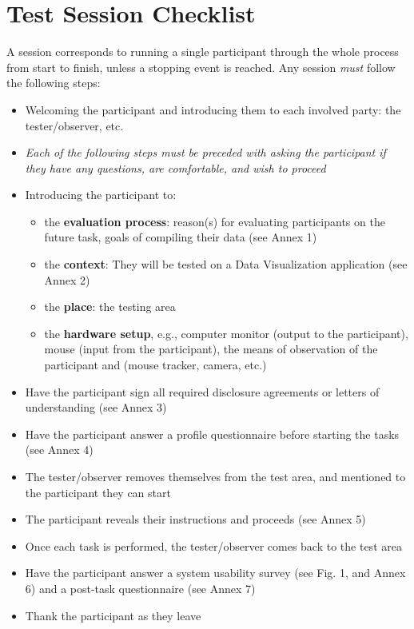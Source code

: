 \documentclass[twocolumn, letterpaper,13pt]{scrartcl}
\begin{document}
    \section*{Test Session Checklist}
    A session corresponds to running a single participant through the whole process from start to finish, unless a stopping event is reached. Any session \textit{must} follow the following steps:
    \begin{itemize}
        \item Welcoming the participant and introducing them to each involved party: the tester/observer, etc.
        \item \textit{Each of the following steps must be preceded with asking the participant if they have any questions, are comfortable, and wish to proceed}
        \item Introducing the participant to:
        \begin{itemize}
            \item the \textbf{evaluation process}: reason(s) for evaluating participants on the future task, goals of compiling their data (see Annex 1)
            \item the \textbf{context}: They will be tested on a Data Visualization application (see Annex 2)
            \item the \textbf{place}: the testing area
            \item the \textbf{hardware setup}, e.g., computer monitor (output to the participant), mouse (input from the participant), the means of observation of the participant and (mouse tracker, camera, etc.)
        \end{itemize}
        \item Have the participant sign all required disclosure agreements or letters of understanding (see Annex 3)
        \item Have the participant answer a profile questionnaire before starting the tasks (see Annex 4)
        \item The tester/observer removes themselves from the test area, and mentioned to the participant they can start
        \item The participant reveals their instructions and proceeds (see Annex 5)
        \item Once each task is performed, the tester/observer comes back to the test area
        \item Have the participant answer a system usability survey (see Fig. 1, and Annex 6) and a post-task questionnaire (see Annex 7)
        \item Thank the participant as they leave
    \end{itemize}
    
\end{document}
